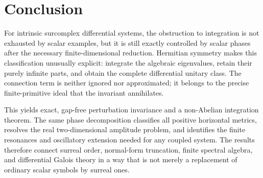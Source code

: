 \documentclass[11pt,a4paper]{article}
\numberwithin{equation}{section}
\theoremstyle{definition}
\theoremstyle{remark}
\begin{document}
\section{Conclusion}
For intrinsic surcomplex differential systems, the obstruction to
integration is not exhausted by scalar examples, but it is still exactly
controlled by scalar phases after the necessary finite-dimensional
reduction. Hermitian symmetry makes this classification unusually
explicit: integrate the algebraic eigenvalues, retain their purely
infinite parts, and obtain the complete differential unitary class.
The connection term is neither ignored nor approximated; it belongs to
the precise finite-primitive ideal that the invariant annihilates.

This yields exact, gap-free perturbation invariance and a non-Abelian
integration theorem. The same phase decomposition classifies all positive
horizontal metrics, resolves the real two-dimensional amplitude problem,
and identifies the finite resonances and oscillatory extension needed
for any coupled system. The results therefore connect surreal order,
normal-form truncation, finite spectral algebra, and differential Galois
theory in a way that is not merely a replacement of ordinary scalar
symbols by surreal ones.
\end{document}
